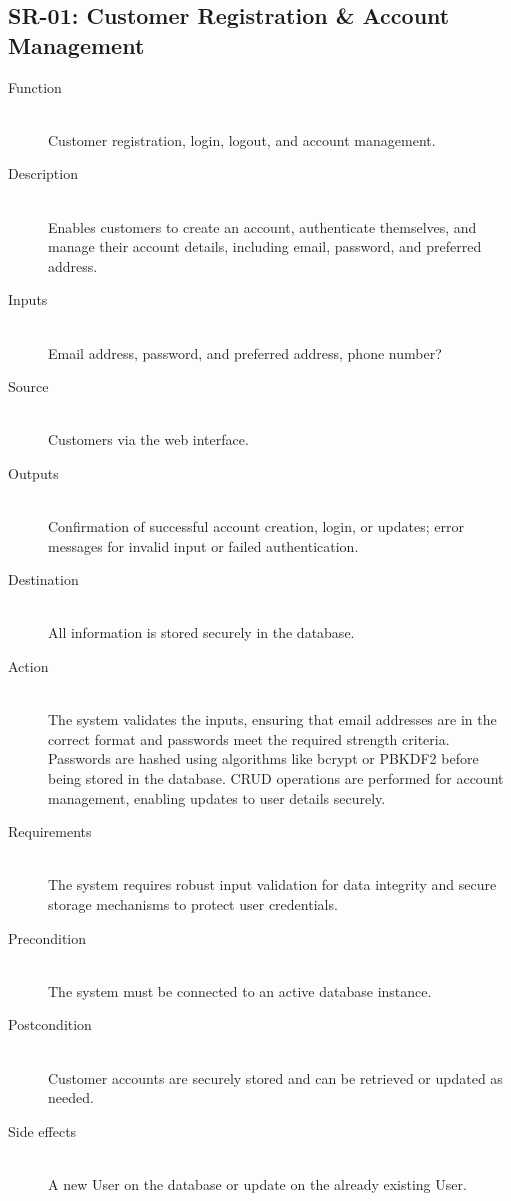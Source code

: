 \documentclass[a4paper,journal]{IEEEtran}
\begin{document}
\subsection{SR-01: Customer Registration \& Account Management}
\begin{description}
  \item[Function] \hfill \\
  Customer registration, login, logout, and account management.
  \item[Description] \hfill \\
  Enables customers to
  create an account, authenticate themselves, and manage their account details,
  including email, password, and preferred address.
  \item[Inputs] \hfill \\
  Email address,
  password, and preferred address, phone number?
  \item[Source] \hfill \\
  Customers via the
  web interface.
  \item[Outputs] \hfill \\
  Confirmation of
  successful account creation, login, or updates; error messages for invalid
  input or failed authentication.
  \item[Destination] \hfill \\
  All information is
  stored securely in the database.
  \item[Action] \hfill \\
  The system validates the inputs, ensuring that email
  addresses are in the correct format and passwords meet the required strength
  criteria. Passwords are hashed using algorithms like bcrypt or PBKDF2 before
  being stored in the database. CRUD operations are performed for account
  management, enabling updates to user details securely.
  \item[Requirements] \hfill \\
  The system requires robust input validation for data
  integrity and secure storage mechanisms to protect user credentials.
  \item[Precondition] \hfill \\
  The system must be connected to an active database
  instance.
  \item[Postcondition] \hfill \\
  Customer accounts are securely stored and can be
  retrieved or updated as needed.
  \item[Side effects] \hfill \\
  A new User on the database or update on the already
  existing User.
\end{description}
\end{document}
